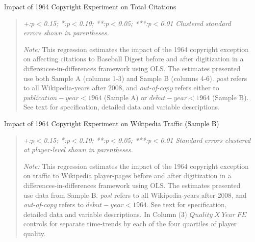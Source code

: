 \begin{center}
\begin{table}[!htbp]
\caption{Impact of 1964 Copyright Experiment on Total Citations}
\vspace{5mm}

\begin{quote}
\vspace{5mm}

\emph{+:p$<$0.15; *:p$<$0.10; **:p$<$0.05; ***:p$<$0.01 
\newline
Clustered standard errors shown in parentheses.}

\vspace{5mm}

\emph{Note:} This regression estimates the impact of the 1964 copyright exception on affecting citations to Baseball Digest before and after digitization in a differences-in-differences framework using OLS. The estimates presented use both Sample A (columns 1-3) and Sample B (columns 4-6). \emph{post} refers to all Wikipedia-years after 2008, and \emph{out-of-copy} refers either to $publication-year < 1964$ (Sample A) or $debut-year < 1964$ (Sample B). See text for specification, detailed data and variable descriptions.

\end{quote}
\label{tab:maindd}
\end{table}
\end{center}


\begin{center}
\begin{table}[!htbp]
\caption{Impact of 1964 Copyright Experiment on Wikipedia Traffic (Sample B)}

\vspace{5mm}

\begin{quote}
\vspace{5mm}
\emph{+:p$<$0.15; *:p$<$0.10; **:p$<$0.05; ***:p$<$0.01 
\newline
Standard errors clustered at player-level shown in parentheses.}
\vspace{5mm}

\emph{Note:} This regression estimates the impact of the 1964 copyright exception on traffic to Wikipedia player-pages before and after digitization in a differences-in-differences framework using OLS. The estimates presented use data from Sample B. \emph{post} refers to all Wikipedia-years after 2008, and \emph{out-of-copy} refers to $debut-year < 1964$. See text for specification, detailed data and variable descriptions. In Column (3) $Quality\ X\ Year\ FE$ controls for separate time-trends by each of the four quartiles of player quality.

\end{quote}
\label{tab:traf}
\end{table}
\end{center}


